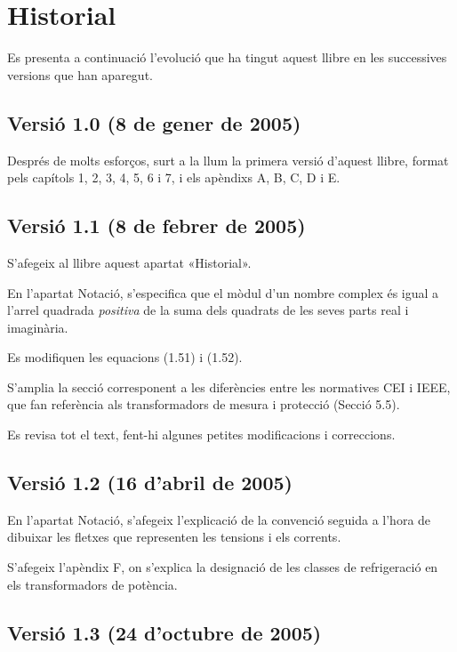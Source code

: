 \chapter*{Historial}

Es presenta a continuació l'evolució que ha tingut aquest llibre en
les successives versions que han aparegut.

\section*{Versió 1.0 (8 de gener de 2005)}

Després de molts esforços, surt a la llum la primera versió d'aquest
llibre, format pels capítols 1, 2, 3, 4, 5, 6 i 7, i els apèndixs A,
B, C, D i E.

\section*{Versió 1.1 (8 de febrer de 2005)}

S'afegeix al llibre aquest apartat «Historial».

En l'apartat Notació, s'especifica que el mòdul d'un nombre
complex és igual a l'arrel quadrada \emph{positiva} de la suma dels
quadrats de les seves parts real i imaginària.

Es modifiquen les equacions (1.51) i (1.52).

S'amplia la secció corresponent a les diferències entre les
normatives CEI i IEEE, que fan referència als
transformadors de mesura i protecció (Secció 5.5).

Es revisa tot el text, fent-hi algunes petites modificacions i
correccions.

\section*{Versió 1.2 (16 d'abril de 2005)}

En l'apartat Notació, s'afegeix l'explicació de la convenció
seguida a l'hora de dibuixar les fletxes que representen les
tensions i els corrents.

S'afegeix l'apèndix F, on s'explica la designació de les classes de
refrigeració en els transformadors de potència.

\section*{Versió 1.3 (24 d'octubre de 2005)}

